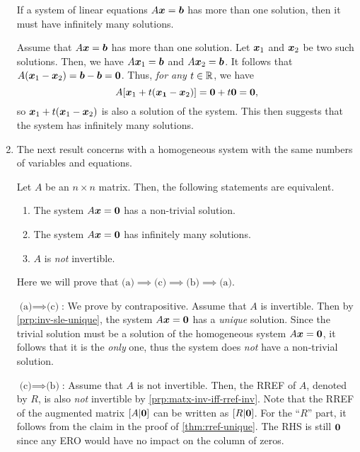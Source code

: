 \begin{enumerate}
\begin{proposition}
\label{prp:sle-more-than-one-sol-inf}
If a system of linear equations \(A\vb*{x}=\vb*{b}\) has more than one
solution, then it must have infinitely many solutions.
\end{proposition}
\begin{pf}
Assume that \(A\vb*{x}=\vb*{b}\) has more than one solution. Let
\(\vb*{x}_1\) and \(\vb*{x}_2\) be two such solutions. Then, we have
\(A\vb*{x}_1=\vb*{b}\) and \(A\vb*{x}_2=\vb*{b}\). It follows that
\(A(\vb*{x}_1-\vb*{x}_2)=\vb*{b}-\vb*{b}=\vb*{0}\). Thus, \emph{for any}
\(t\in\mathbb{R}\), we have
\[
A[\vb*{x}_1+t(\vb*{x_1}-\vb*{x}_2)]
=\vb*{0}+t\vb*{0}
=\vb*{0},
\]
so \(\vb*{x}_1+t(\vb*{x}_1-\vb*{x}_2)\) is also a solution of the system.
This then suggests that the system has infinitely many solutions.
\end{pf}

\item The next result concerns with a homogeneous system with the same numbers
of variables and equations.

\begin{proposition}
\label{prp:homo-same-var-eqs-equiv}
Let \(A\) be an \(n\times n\) matrix. Then, the following statements are
equivalent.
\begin{enumerate}
\item The system \(A\vb*{x}=\vb*{0}\) has a non-trivial solution.
\item The system \(A\vb*{x}=\vb*{0}\) has infinitely many solutions.
\item \(A\) is \emph{not} invertible.
\end{enumerate}
\end{proposition}
\begin{pf}
Here we will prove that \(\text{(a)}\implies \text{(c)}\implies
\text{(b)}\implies \text{(a)}\).

\underline{\(\text{(a)}\implies \text{(c)}\)}: We prove by contrapositive.
Assume that \(A\) is invertible. Then by \cref{prp:inv-sle-unique}, the system
\(A\vb*{x}=\vb*{0}\) has a \emph{unique} solution. Since the trivial solution
must be a solution of the homogeneous system \(A\vb*{x}=\vb*{0}\), it follows
that it is the \emph{only} one, thus the system does \emph{not} have a
non-trivial solution.

\underline{\(\text{(c)}\implies\text{(b)}\)}: Assume that \(A\) is not
invertible. Then, the RREF of \(A\), denoted by \(R\), is also \emph{not} invertible
by \cref{prp:matx-inv-iff-rref-inv}. Note that the RREF of the augmented matrix
\([A|\vb*{0}]\) can be written as \([R|\vb*{0}]\). For the ``\(R\)'' part, it
follows from the claim in the proof of \cref{thm:rref-unique}. The RHS is still
\(\vb*{0}\) since any ERO would have no impact on the column of zeros.


\end{pf}
\end{enumerate}

